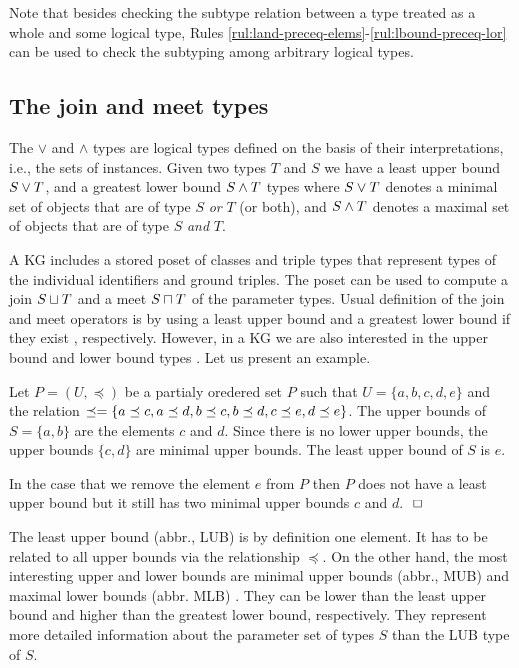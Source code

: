 \documentclass[runningheads]{llncs}
\newcommand{\finbox}{\phantom{.}\hfill\Box}
\begin{document}
Note that besides checking the subtype relation between a type treated
as a whole and some logical type, Rules
\ref{rul:land-preceq-elems}-\ref{rul:lbound-preceq-lor} can be used to
check the subtyping among arbitrary logical types.






\subsection{The join and meet types\label{sec:join-meet-types}}

The $\lor$ and $\land$ types are logical types defined on the basis of
their interpretations, i.e., the sets of instances. Given two types
$T$ and $S$ we have a least upper bound $S\lor\/T$, and a greatest
lower bound $S\land\/T$ types where $S\lor\/T$ denotes a minimal set
of objects that are of type $S$ \emph{or} $T$ (or both), and
$S\land\/T$ denotes a maximal set of objects that are of type $S$
\emph{and} $T$.

A KG includes a stored poset of classes and triple types that
represent types of the individual identifiers and ground triples. The
poset can be used to compute a join $S\sqcup\/T$ and a meet
$S\sqcap\/T$ of the parameter types. Usual definition of the join and
meet operators is by using a least upper bound and a greatest lower
bound if they exist \cite{Pierce2002}, respectively. However, in a KG
we are also interested in the upper bound and lower bound types
\cite{DaveyPriestley2002}. Let us present an example.

\begin{example}
  Let $P=(U,\preceq)$ be a partialy oredered set $P$ such that
  $U=\{a,b,c,d,e\}$ and the relation
  $\preceq=\{a\preceq\/c,a\preceq\/d,b\preceq\/c,b\preceq\/d,c\preceq\/e,d\preceq\/e\}$.
  The upper bounds of $S=\{a,b\}$ are the elements $c$ and $d$. Since
  there is no lower upper bounds, the upper bounds $\{c,d\}$ are
  minimal upper bounds. The least upper bound of $S$ is $e$.

  In the case that we remove the element $e$ from $P$ then $P$ does
  not have a least upper bound but it still has two minimal upper
  bounds $c$ and $d$. $\finbox$
\end{example}

The least upper bound (abbr., LUB) is by definition one element. It has
to be related to all upper bounds via the relationship $\preceq$. On
the other hand, the most interesting upper and lower bounds are
minimal upper bounds (abbr., MUB) and maximal lower bounds (abbr. MLB)
\cite{Knudstorp2024}. They can be lower than the least upper bound and
higher than the greatest lower bound, respectively. They represent
more detailed information about the parameter set of types $S$ than
the LUB type of $S$.
\end{document}
